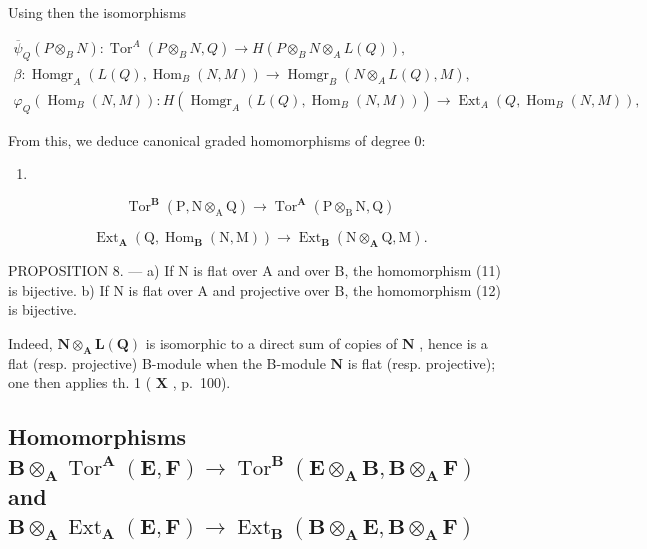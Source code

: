 Using then the isomorphisms

\[
\begin{array}{c} \overline {{\psi}} _ {Q} (P \otimes_ {B} N): \operatorname{Tor} ^ {A} (P \otimes_ {B} N, Q) \to H (P \otimes_ {B} N \otimes_ {A} L (Q)), \\ \beta : \operatorname{Homgr} _ {A} (L (Q), \operatorname{Hom} _ {B} (N, M)) \to \operatorname{Homgr} _ {B} (N \otimes_ {A} L (Q), M), \\ \varphi_ {Q} (\operatorname{Hom} _ {B} (N, M)): H (\operatorname{Homgr} _ {A} (L (Q), \operatorname{Hom} _ {B} (N, M))) \to \operatorname{Ext} _ {A} (Q, \operatorname{Hom} _ {B} (N, M)), \end{array}
\]

From this, we deduce canonical graded homomorphisms of degree 0:

\begin{enumerate}
\def\labelenumi{(\arabic{enumi})}
\setcounter{enumi}{10}
\tightlist
\item
\end{enumerate}

\[
\operatorname{Tor} ^ {\mathbf {B}} (\mathrm{P}, \mathrm{N} \otimes_ {\mathrm{A}} \mathrm{Q}) \rightarrow \operatorname{Tor} ^ {\mathbf {A}} (\mathrm{P} \otimes_ {\mathrm{B}} \mathrm{N}, \mathrm{Q})\tag{12}
\]

\[
\operatorname{Ext} _ {\mathbf {A}} \left(\mathrm{Q}, \operatorname{Hom} _ {\mathbf {B}} (\mathrm{N}, \mathrm{M})\right)\rightarrow \operatorname{Ext} _ {\mathbf {B}} \left(\mathrm{N} \otimes_ {\mathbf {A}} \mathrm{Q}, \mathrm{M}\right).
\]

PROPOSITION 8. --- a) If N is flat over A and over B, the homomorphism (11) is bijective. b) If N is flat over A and projective over B, the homomorphism (12) is bijective.

Indeed, \(\mathbf{N} \otimes_{\mathbf{A}} \mathbf{L}(\mathbf{Q})\) is isomorphic to a direct sum of copies of \(\mathbf{N}\) , hence is a flat (resp. projective) B-module when the B-module \(\mathbf{N}\) is flat (resp. projective); one then applies th. 1 ( \(\mathbf{X}\) , p.~100).

\subsection{\texorpdfstring{Homomorphisms \(\mathbf{B} \otimes_{\mathbf{A}} \operatorname{Tor}^{\mathbf{A}}(\mathbf{E}, \mathbf{F}) \to \operatorname{Tor}^{\mathbf{B}}(\mathbf{E} \otimes_{\mathbf{A}} \mathbf{B}, \mathbf{B} \otimes_{\mathbf{A}} \mathbf{F})\) and \(\mathbf{B} \otimes_{\mathbf{A}} \operatorname{Ext}_{\mathbf{A}}(\mathbf{E}, \mathbf{F}) \to \operatorname{Ext}_{\mathbf{B}}(\mathbf{B} \otimes_{\mathbf{A}} \mathbf{E}, \mathbf{B} \otimes_{\mathbf{A}} \mathbf{F})\)}{Extension-of-scalars homomorphisms for Tor and Ext}}

